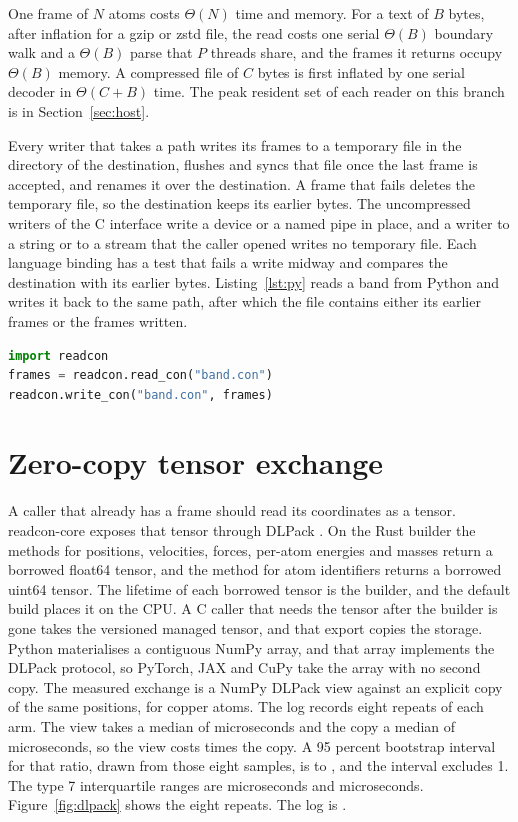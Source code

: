\documentclass[preprint,12pt]{elsarticle}
\begin{document}
One frame of \(N\) atoms costs \(\Theta(N)\) time and memory.
For a text of \(B\) bytes, after inflation for a gzip or zstd file, the
read costs one serial \(\Theta(B)\) boundary walk and a \(\Theta(B)\)
parse that \(P\) threads share, and the frames it returns occupy
\(\Theta(B)\) memory.
A compressed file of \(C\) bytes is first inflated by one serial decoder
in \(\Theta(C+B)\) time.
The peak resident set of each reader on this branch is in
Section~\ref{sec:host}.

Every writer that takes a path writes its frames to a temporary file in
the directory of the destination, flushes and syncs that file once the
last frame is accepted, and renames it over the destination.
A frame that fails deletes the temporary file, so the destination keeps
its earlier bytes.
The uncompressed writers of the C interface write a device or a named
pipe in place, and a writer to a string or to a stream that the caller
opened writes no temporary file.
Each language binding has a test that fails a write midway and compares
the destination with its earlier bytes.
Listing~\ref{lst:py} reads a band from Python and writes it back to the
same path, after which the file contains either its earlier frames or
the frames written.

\begin{lstlisting}[language=Python,caption={\textbf{A checkpoint round trip in Python.} The default printer keeps every binary64 value; six decimals are a separate argument.},label={lst:py}]
import readcon
frames = readcon.read_con("band.con")
readcon.write_con("band.con", frames)
\end{lstlisting}

\section{Zero-copy tensor exchange}\label{sec:dlpack} A caller that
already has a frame should read its coordinates as a tensor.
readcon-core exposes that tensor through DLPack \cite{dlpackDLPack2026}.
On the Rust builder the methods for positions, velocities, forces,
per-atom energies and masses return a borrowed float64 tensor, and the
method for atom identifiers returns a borrowed uint64 tensor.
The lifetime of each borrowed tensor is the builder, and the default
build places it on the CPU.
A C caller that needs the tensor after the builder is gone takes the
versioned managed tensor, and that export copies the storage.
Python materialises a contiguous NumPy array, and that array implements
the DLPack protocol, so PyTorch, JAX and CuPy take the array with no
second copy.
The measured exchange is a NumPy DLPack view against an explicit copy of
the same positions, for \dlpackAtoms{} copper atoms.
The log records eight repeats of each arm.
The view takes a median of \dlpackViewUs{} microseconds and the copy a
median of \dlpackCopyUs{} microseconds, so the view costs \dlpackRatio{}
times the copy.
A 95 percent bootstrap interval for that ratio, drawn from those eight
samples, is \dlpackRatioLo{} to \dlpackRatioHi{}, and the interval
excludes 1.
The type 7 interquartile ranges are \dlpackViewIqr{} microseconds and
\dlpackCopyIqr{} microseconds.
Figure~\ref{fig:dlpack} shows the eight repeats.
The log is .
\end{document}
